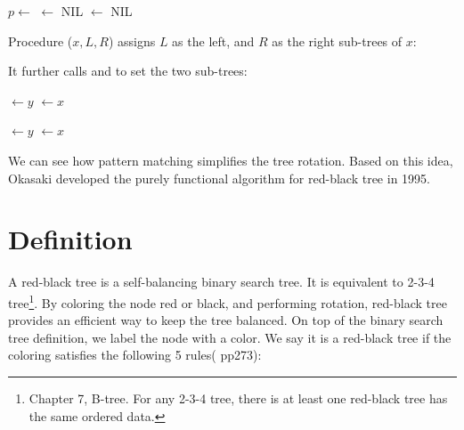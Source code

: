 \documentclass[b5paper]{article}
\begin{document}
\begin{algorithmic}[1]
  \State $p \gets$ 
   
            $\gets$ NIL
    \EndIf
    \State {}
  \Else
    \State {}
  \EndIf
  \State {} $\gets$ NIL
\EndFunction
\end{algorithmic}

Procedure ($x, L, R$) assigns $L$ as the left, and $R$ as the right sub-trees of $x$:

\begin{algorithmic}[1]
  \State {}
  \State {}
\EndFunction
\end{algorithmic}

It further calls  and  to set the two sub-trees:

\begin{algorithmic}[1]
  \State {} $\gets y$
     $\gets x$
  \EndIf
  \EndFunction

\Statex

  \State {} $\gets y$
     $\gets x$
  \EndIf
\EndFunction
\end{algorithmic}

We can see how pattern matching simplifies the tree rotation. Based on this idea, Okasaki developed the purely functional algorithm for red-black tree in 1995\cite{okasaki}.

\begin{Exercise}
\end{Exercise}

\section{Definition}

A red-black tree is a self-balancing binary search tree\cite{wiki-rbt}. It is equivalent to 2-3-4 tree\footnote{Chapter 7, B-tree. For any 2-3-4 tree, there is at least one red-black tree has the same ordered data.}. By coloring the node red or black, and performing rotation, red-black tree provides an efficient way to keep the tree balanced. On top of the binary search tree definition, we label the node with a color. We say it is a red-black tree if the coloring satisfies the following 5 rules(\cite{CLRS} pp273):
\end{document}
